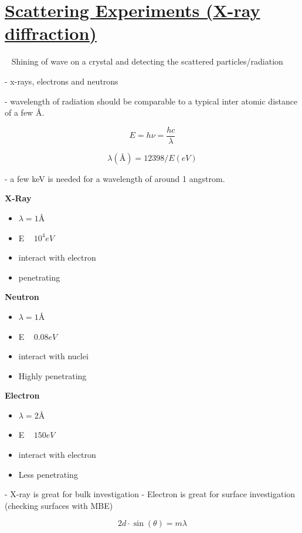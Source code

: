 \section[Scattering Experiments (X-ray diffraction)]{\hyperlink{toc}{Scattering Experiments (X-ray diffraction)}}

~ Shining of wave on a crystal and detecting the scattered particles/radiation

- x-rays, electrons and neutrons

- wavelength of radiation should be comparable to a typical inter atomic distance of a few $\text{\AA}$.

\[E = h\nu = \frac{hc}{\lambda}\]

\[ \lambda(\text{\AA}) = 12398/E(eV)\]

- a few keV is needed for a wavelength of around 1 angstrom.

\textbf{X-Ray}
\begin{itemize}
    \item $\lambda = 1 \text{\AA}$
    \item E ~ $10^4 eV$
    \item interact with electron
    \item penetrating
\end{itemize}
\textbf{Neutron}
\begin{itemize}
    \item $\lambda = 1 \text{\AA}$
    \item E ~ $0.08 eV$
    \item interact with nuclei
    \item Highly penetrating
\end{itemize}
\textbf{Electron}
\begin{itemize}
    \item $\lambda = 2 \text{\AA}$
    \item E ~ $150 eV$
    \item interact with electron
    \item Less penetrating
\end{itemize}

- X-ray is great for bulk investigation
- Electron is great for surface investigation (checking surfaces with MBE)



\begin{tcolorbox}[enhanced,attach boxed title to top center={yshift=-3mm,yshifttext=-1mm},
  colback=blue!5!white,colframe=blue!75!black,colbacktitle=red!80!black,
  title=The Bragg Law,fonttitle=\bfseries,
  boxed title style={size=small,colframe=red!50!black} ]
  \begin{equation}
      2d\cdot\sin(\theta) = m\lambda 
  \end{equation}
\end{tcolorbox}

